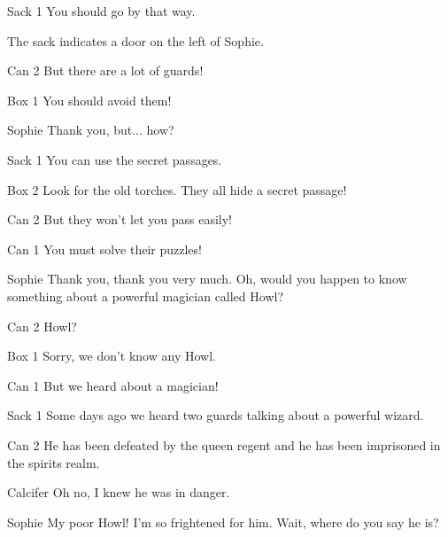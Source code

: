 \begin{screenplay}
\begin{dialogue}{Sack 1}
You should go by that way.
\end{dialogue}
The sack indicates a door on the left of Sophie.
\begin{dialogue}{Can 2}
But there are a lot of guards!
\end{dialogue}
\begin{dialogue}{Box 1}
You should avoid them!
\end{dialogue}
\begin{dialogue}{Sophie}
Thank you, but... how?
\end{dialogue}
\begin{dialogue}{Sack 1}
You can use the secret passages.
\end{dialogue}
\begin{dialogue}{Box 2}
Look for the old torches. They all hide a secret passage!
\end{dialogue}
\begin{dialogue}{Can 2}
But they won't let you pass easily!
\end{dialogue}
\begin{dialogue}{Can 1}
You must solve their puzzles!
\end{dialogue}
\begin{dialogue}[grateful]{Sophie}
Thank you, thank you very much. Oh, would you happen to know something about a powerful magician called Howl?
\end{dialogue}
\begin{dialogue}{Can 2}
Howl?
\end{dialogue}
\begin{dialogue}{Box 1}
Sorry, we don’t know any Howl.
\end{dialogue}
\begin{dialogue}{Can 1}
But we heard about a magician!
\end{dialogue}
\begin{dialogue}{Sack 1}
Some days ago we heard two guards talking about a powerful wizard.
\end{dialogue}
\begin{dialogue}{Can 2}
He has been defeated by the queen regent and he has been imprisoned in the spirits realm.
\end{dialogue}
\begin{dialogue}{Calcifer}
Oh no, I knew he was in danger.
\end{dialogue}
\begin{dialogue}{Sophie}
My poor Howl! I’m so frightened for him. Wait, where do you say he is?

\end{dialogue}
\end{screenplay}
